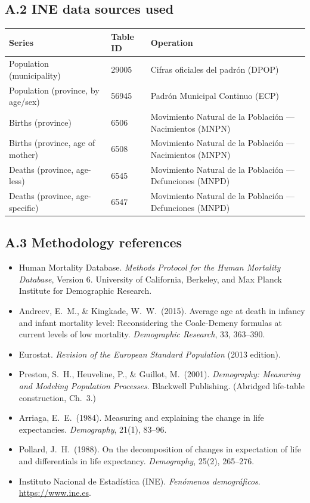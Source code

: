 \documentclass[11pt]{article}
\begin{document}
\subsection*{A.2 INE data sources used}

\begin{longtable}{@{}p{3.3cm}p{2cm}p{9.5cm}@{}}
\toprule
Series & Table ID & Operation \\
\midrule
\endhead
Population (municipality) & 29005 & Cifras oficiales del padr\'{o}n (DPOP) \\
Population (province, by age/sex) & 56945 & Padr\'{o}n Municipal Continuo (ECP) \\
Births (province) & 6506 & Movimiento Natural de la Poblaci\'{o}n --- Nacimientos (MNPN) \\
Births (province, age of mother) & 6508 & Movimiento Natural de la Poblaci\'{o}n --- Nacimientos (MNPN) \\
Deaths (province, age-less) & 6545 & Movimiento Natural de la Poblaci\'{o}n --- Defunciones (MNPD) \\
Deaths (province, age-specific) & 6547 & Movimiento Natural de la Poblaci\'{o}n --- Defunciones (MNPD) \\
\bottomrule
\end{longtable}

\subsection*{A.3 Methodology references}

\begin{itemize}
  \item Human Mortality Database. \emph{Methods Protocol for the Human
    Mortality Database}, Version 6. University of California, Berkeley, and
    Max Planck Institute for Demographic Research.
  \item Andreev, E.\ M., \& Kingkade, W.\ W.\ (2015). Average age at death
    in infancy and infant mortality level: Reconsidering the Coale-Demeny
    formulas at current levels of low mortality. \emph{Demographic
    Research}, 33, 363--390.
  \item Eurostat. \emph{Revision of the European Standard Population}
    (2013 edition).
  \item Preston, S.\ H., Heuveline, P., \& Guillot, M.\ (2001).
    \emph{Demography: Measuring and Modeling Population Processes}.
    Blackwell Publishing. (Abridged life-table construction, Ch.\ 3.)
  \item Arriaga, E.\ E.\ (1984). Measuring and explaining the change in
    life expectancies. \emph{Demography}, 21(1), 83--96.
  \item Pollard, J.\ H.\ (1988). On the decomposition of changes in
    expectation of life and differentials in life expectancy.
    \emph{Demography}, 25(2), 265--276.
  \item Instituto Nacional de Estad\'{i}stica (INE). \emph{Fen\'{o}menos
    demogr\'{a}ficos}. \url{https://www.ine.es}.
\end{itemize}
\end{document}
